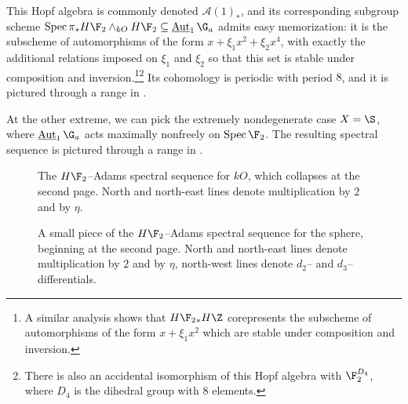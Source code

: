 \begin{example}
\begin{center}
\end{center}
This Hopf algebra is commonly denoted $\mathcal A(1)_*$, and its corresponding subgroup scheme $\Spec \pi_* H\F_2 \sm_{kO} H\F_2 \subseteq \InternalAut_1 \G_a$ admits easy memorization: it is the subscheme of automorphisms of the form $x + \xi_1 x^2 + \xi_2 x^4$, with exactly the additional relations imposed on $\xi_1$ and $\xi_2$ so that this set is stable under composition and inversion.\footnote{A similar analysis shows that $H\F_2{}_* H\Z$ corepresents the subscheme of automorphisms of the form $x + \xi_1 x^2$ which are stable under composition and inversion.}\footnote{There is also an accidental isomorphism of this Hopf algebra with $\F_2^{D_4}$, where $D_4$ is the dihedral group with $8$ elements.}  Its cohomology is periodic with period $8$, and it is pictured through a range in .
\end{example}

\begin{example}
At the other extreme, we can pick the extremely nondegenerate case $X = \S$, where $\InternalAut_1 \G_a$ acts maximally nonfreely on $\Spec \F_2$.  The resulting spectral sequence is pictured through a range in .
\end{example}


\begin{sidewaysfigure}
\centering

\caption{The $H\F_2$--Adams spectral sequence for $kO$, which collapses at the second page.  North and north-east lines denote multiplication by $2$ and by $\eta$.}\label{kOASSFigure}
\end{sidewaysfigure}
\begin{sidewaysfigure}
\centering

\caption{A small piece of the $H\F_2$--Adams spectral sequence for the sphere, beginning at the second page.  North and north-east lines denote multiplication by $2$ and by $\eta$, north-west lines denote $d_2$-- and $d_3$--differentials.}\label{HF2ASSFigure}
\end{sidewaysfigure}











